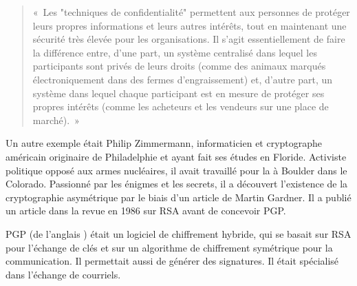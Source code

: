 \begin{quote}
«~Les "techniques de confidentialité" permettent aux personnes de protéger leurs propres informations et leurs autres intérêts, tout en maintenant une sécurité très élevée pour les organisations. Il s'agit essentiellement de faire la différence entre, d'une part, un système centralisé dans lequel les participants sont privés de leurs droits (comme des animaux marqués électroniquement dans des fermes d'engraissement) et, d'autre part, un système dans lequel chaque participant est en mesure de protéger ses propres intérêts (comme les acheteurs et les vendeurs sur une place de marché).~»
\end{quote} %

Un autre exemple était Philip Zimmermann, informaticien et cryptographe américain originaire de Philadelphie et ayant fait ses études en Floride. Activiste politique opposé aux armes nucléaires, il avait travaillé pour la  à Boulder dans le Colorado. Passionné par les énigmes et les secrets, il a découvert l'existence de la cryptographie asymétrique par le biais d'un article de Martin Gardner. Il a publié un article dans la revue  en 1986 sur RSA avant de concevoir PGP.

PGP (de l'anglais ) était un logiciel de chiffrement hybride, qui se basait sur RSA pour l'échange de clés et sur un algorithme de chiffrement symétrique pour la communication. Il permettait aussi de générer des signatures. Il était spécialisé dans l'échange de courriels.

